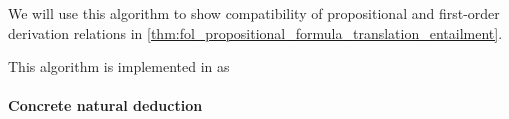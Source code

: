 \begin{comments}
  \item We will use this algorithm to show compatibility of propositional and first-order derivation relations in \cref{thm:fol_propositional_formula_translation_entailment}.

  \item This algorithm is implemented in \cite{notebook:code} as
  \begin{CodeRefDisplay}
  \end{CodeRefDisplay}
\end{comments}

\paragraph{Concrete natural deduction}

